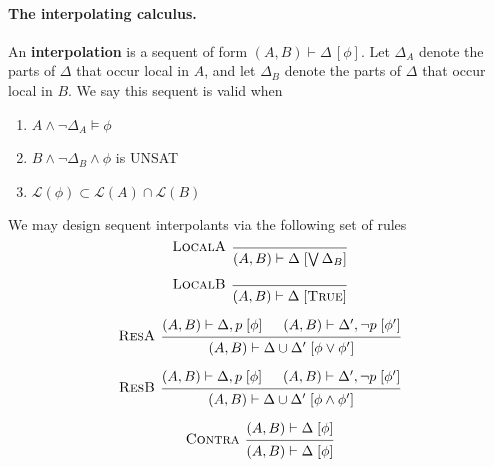 \documentclass[11pt]{article}
\theoremstyle{plain}
\theoremstyle{definition}
\theoremstyle{remark}
\begin{document}
\paragraph{The interpolating calculus.}
An \textbf{interpolation} is a sequent of form $(A, B) \vdash \Delta \,[\phi]$. Let $\Delta_A$ denote the parts of $\Delta$ that occur local in $A$, and let $\Delta_B$ denote the parts of $\Delta$ that occur local in $B$. We say this sequent is valid when
\begin{enumerate}
    \item $A \wedge \neg \Delta_A \vDash \phi$
    \item $B \wedge \neg \Delta_B \wedge \phi$ is UNSAT
    \item $\mathcal{L}(\phi)\subset \mathcal{L}(A)\cap\mathcal{L}(B)$
\end{enumerate}
We may design sequent interpolants via the following set of rules
\begin{gather*}
\begin{prooftree}
  \infer[
    left label=\textsc{LocalA},
    right label={$\bigwedge A \models_{\mathcal T} \bigvee\Delta,
                  \quad \Delta \subseteq \mathcal L(A)$}
  ]0{
    (A,B) \vdash \Delta \; [\bigvee\Delta_B]
  }
\end{prooftree}
\\[1.5ex]
\begin{prooftree}
  \infer[
    left label=\textsc{LocalB},
    right label={$\bigwedge B \models_{\mathcal T} \bigvee\Delta,
                  \quad \Delta \subseteq \mathcal L(B)$}
  ]0{
    (A,B) \vdash \Delta \; [\text{\textsc{True}}]
  }
\end{prooftree}
\\[1.5ex]
\begin{prooftree}
  \hypo{(A,B) \vdash \Delta,p \; [\phi]}
  \hypo{(A,B) \vdash \Delta',\neg p \; [\phi']}
  \infer[
    left label=\textsc{ResA},
    right label={$p \in \mathcal L(A) \setminus \mathcal L(B)$}
  ]2{
    (A,B) \vdash \Delta \cup \Delta' \; [\phi \lor \phi']
  }
\end{prooftree}
\\[1.5ex]
\begin{prooftree}
  \hypo{(A,B) \vdash \Delta,p \; [\phi]}
  \hypo{(A,B) \vdash \Delta',\neg p \; [\phi']}
  \infer[
    left label=\textsc{ResB},
    right label={$p \in \mathcal L(B)$}
  ]2{
    (A,B) \vdash \Delta \cup \Delta' \; [\phi \land \phi']
  }
\end{prooftree}
\\[1.5ex]
\begin{prooftree}
  \hypo{(A,B) \vdash \Delta \; [\phi]}
  \infer[
    left label=\textsc{Contra}
  ]1{
    (A,B) \vdash \Delta \; [\phi]
  }
\end{prooftree}
\end{gather*}
\end{document}
